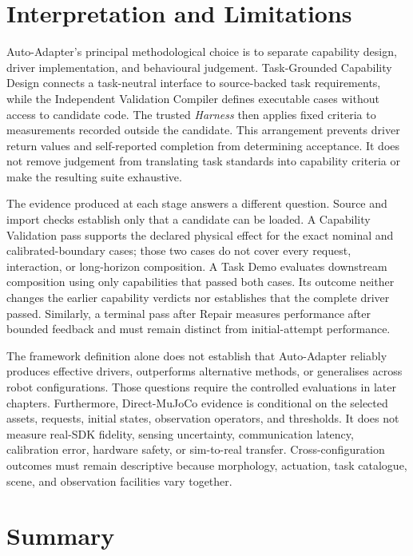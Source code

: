 \section{Interpretation and Limitations}

Auto-Adapter's principal methodological choice is to separate capability
design, driver implementation, and behavioural judgement. Task-Grounded
Capability Design connects a task-neutral interface to source-backed task
requirements, while the Independent Validation Compiler defines executable
cases without access to candidate code. The trusted \emph{Harness} then applies
fixed criteria to measurements recorded outside the candidate. This arrangement
prevents driver return values and self-reported completion from determining
acceptance. It does not remove judgement from translating task standards into
capability criteria or make the resulting suite exhaustive.

The evidence produced at each stage answers a different question. Source and
import checks establish only that a candidate can be loaded. A Capability
Validation pass supports the declared physical effect for the exact nominal and
calibrated-boundary cases; those two cases do not cover every request,
interaction, or long-horizon composition. A Task Demo evaluates downstream
composition using only capabilities that passed both cases. Its outcome neither
changes the earlier capability verdicts nor establishes that the complete
driver passed. Similarly, a terminal pass after Repair measures performance
after bounded feedback and must remain distinct from initial-attempt
performance.

The framework definition alone does not establish that Auto-Adapter reliably
produces effective drivers, outperforms alternative methods, or generalises
across robot configurations. Those questions require the controlled
evaluations in later chapters. Furthermore, Direct-MuJoCo evidence is
conditional on the selected assets, requests, initial states, observation
operators, and thresholds. It does not measure real-SDK fidelity, sensing
uncertainty, communication latency, calibration error, hardware safety, or
sim-to-real transfer. Cross-configuration outcomes must remain descriptive
because morphology, actuation, task catalogue, scene, and observation
facilities vary together.

\section{Summary}

